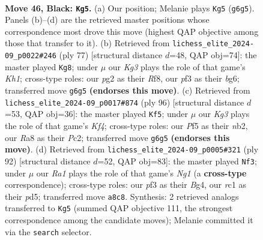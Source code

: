 \documentclass[11pt]{article}
\begin{document}
\clearpage

\begin{figure}[p]\centering
\begin{subfigure}{0.46\textwidth}\centering
\resizebox{\linewidth}{!}{%
\newchessgame
\chessboard[
  setfen={r7/pn6/1pr1p1kp/5p2/2P4R/N1B1PP2/P5P1/2R2K2 b - - 0 46},
  showmover=false,
  pgfstyle=straightmove, color=movearrow, markmove={g6-g5}
]}
\caption{}
\end{subfigure}\hfill
\begin{subfigure}{0.46\textwidth}\centering
\resizebox{\linewidth}{!}{%
\newchessgame
\chessboard[
  setfen={5r1k/1p1R2p1/2p3Bp/2P4P/pr3p2/4p3/1P4P1/1R4K1 b - - 0 39},
  showmover=false,
  pgfstyle=straightmove, color=movearrow, markmove={h8-g8}
]}
\caption{}
\end{subfigure}
\\[4pt]
\begin{subfigure}{0.46\textwidth}\centering
\resizebox{\linewidth}{!}{%
\newchessgame
\chessboard[
  setfen={8/6k1/1p2r2p/p1p1P3/3p1KP1/1P3N1P/1nP1R3/8 w - - 0 49},
  showmover=false,
  pgfstyle=straightmove, color=movearrow, markmove={f4-f5}
]}
\caption{}
\end{subfigure}\hfill
\begin{subfigure}{0.46\textwidth}\centering
\resizebox{\linewidth}{!}{%
\newchessgame
\chessboard[
  setfen={8/r4pb1/2p3k1/n2p4/pr1P1PB1/6P1/RPR2PK1/6N1 w - - 20 47},
  showmover=false,
  pgfstyle=straightmove, color=movearrow, markmove={g1-f3}
]}
\caption{}
\end{subfigure}
\caption{\textbf{Move 46, Black: \texttt{Kg5}.} (a) Our position; Melanie plays \texttt{Kg5} (\texttt{g6g5}). Panels (b)--(d) are the retrieved master positions whose correspondence most drove this move (highest QAP objective among those that transfer to it). (b) Retrieved from \texttt{lichess\_elite\_2024-09\_p0022\#246} (ply 77) [structural distance $d$=48, QAP obj=74]: the master played \texttt{Kg8}; under $\mu$ our \emph{Kg3} plays the role of that game's \emph{Kh1}; cross-type roles: our \emph{p}g2 as their \emph{R}f8, our \emph{p}f3 as their \emph{b}g6; transferred move \texttt{g6g5} \textbf{(endorses this move)}. (c) Retrieved from \texttt{lichess\_elite\_2024-09\_p0017\#874} (ply 96) [structural distance $d$=53, QAP obj=36]: the master played \texttt{Kf5}; under $\mu$ our \emph{Kg3} plays the role of that game's \emph{Kf4}; cross-type roles: our \emph{P}f5 as their \emph{n}b2, our \emph{R}a8 as their \emph{P}c2; transferred move \texttt{g6g5} \textbf{(endorses this move)}. (d) Retrieved from \texttt{lichess\_elite\_2024-09\_p0005\#321} (ply 92) [structural distance $d$=52, QAP obj=83]: the master played \texttt{Nf3}; under $\mu$ our \emph{Ra1} plays the role of that game's \emph{Ng1} (a \textbf{cross-type} correspondence); cross-type roles: our \emph{p}f3 as their \emph{B}g4, our \emph{r}c1 as their \emph{p}d5; transferred move \texttt{a8c8}. Synthesis: 2 retrieved analogs transferred to \texttt{Kg5} (summed QAP objective 111, the strongest correspondence among the candidate moves); Melanie committed it via the \texttt{search} selector.}
\label{fig:thought-m91}
\end{figure}
\end{document}
